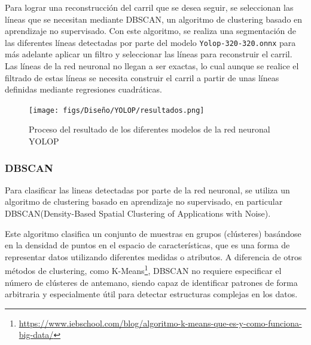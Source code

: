 Para lograr una reconstrucción del carril que se desea seguir, se seleccionan las líneas que se necesitan mediante DBSCAN, un algoritmo de clustering basado en aprendizaje no supervisado. 
Con este algoritmo, se realiza una segmentación de las diferentes líneas detectadas por parte del modelo \texttt{Yolop-320-320.onnx} para más adelante aplicar un filtro y seleccionar las líneas 
para reconstruir el carril. Las líneas de la red neuronal no llegan a ser exactas, lo cual aunque se realice el filtrado de estas líneas se necesita construir el carril a partir de unas líneas 
definidas mediante regresiones cuadráticas. 
\begin{figure} [H]
  \begin{center}
    \texttt{[image: figs/Diseño/YOLOP/resultados.png]}
  \end{center}
  \caption{Proceso del resultado de los diferentes modelos de la red neuronal YOLOP}
  \label{Proceso-YOLOP}
\end{figure}
\newpage
\subsubsection{DBSCAN}
\label{sec:DBSCAN}

Para clasificar las lineas detectadas por parte de la red neuronal, se utiliza un algoritmo de clustering basado en aprendizaje no supervisado, en particular
DBSCAN(Density-Based Spatial Clustering of Applications with Noise)\cite{ski_dbs}.

Este algoritmo clasifica un conjunto de muestras en grupos (clústeres) basándose en la densidad de puntos en el espacio de características, que es una forma de representar
datos utilizando diferentes medidas o atributos. A diferencia de otros métodos de clustering, como K-Means\footnote{\url{https://www.iebschool.com/blog/algoritmo-k-means-que-es-y-como-funciona-big-data/}}, 
DBSCAN no requiere especificar el número de clústeres de antemano, 
siendo capaz de identificar patrones de forma arbitraria y especialmente útil para detectar estructuras complejas en los datos. 

